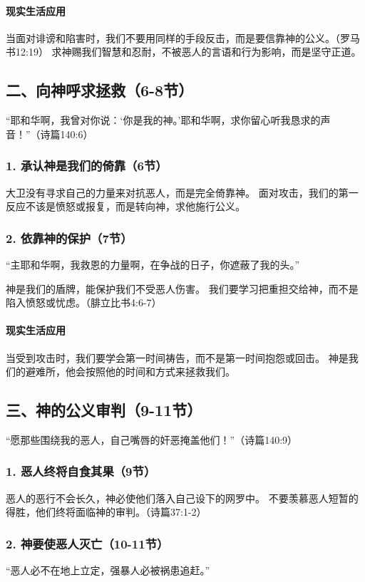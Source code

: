 \documentclass[a4paper, 12pt]{article}
\begin{document}
\paragraph*{现实生活应用}
当面对诽谤和陷害时，我们不要用同样的手段反击，而是要信靠神的公义。（罗马书12:19）
求神赐我们智慧和忍耐，不被恶人的言语和行为影响，而是坚守正道。
\subsection*{二、向神呼求拯救（6-8节）}
“耶和华啊，我曾对你说：‘你是我的神。’耶和华啊，求你留心听我恳求的声音！”（诗篇140:6）

\subsubsection*{1. 承认神是我们的倚靠（6节）}
大卫没有寻求自己的力量来对抗恶人，而是完全倚靠神。
面对攻击，我们的第一反应不该是愤怒或报复，而是转向神，求他施行公义。
\subsubsection*{2. 依靠神的保护（7节）}
“主耶和华啊，我救恩的力量啊，在争战的日子，你遮蔽了我的头。”

神是我们的盾牌，能保护我们不受恶人伤害。
我们要学习把重担交给神，而不是陷入愤怒或忧虑。（腓立比书4:6-7）
\paragraph*{现实生活应用}
当受到攻击时，我们要学会第一时间祷告，而不是第一时间抱怨或回击。
神是我们的避难所，他会按照他的时间和方式来拯救我们。
\subsection*{三、神的公义审判（9-11节）}
“愿那些围绕我的恶人，自己嘴唇的奸恶掩盖他们！”（诗篇140:9）

\subsubsection*{1. 恶人终将自食其果（9节）}
恶人的恶行不会长久，神必使他们落入自己设下的网罗中。
不要羡慕恶人短暂的得胜，他们终将面临神的审判。（诗篇37:1-2）
\subsubsection*{2. 神要使恶人灭亡（10-11节）}
“恶人必不在地上立定，强暴人必被祸患追赶。”
\end{document}
